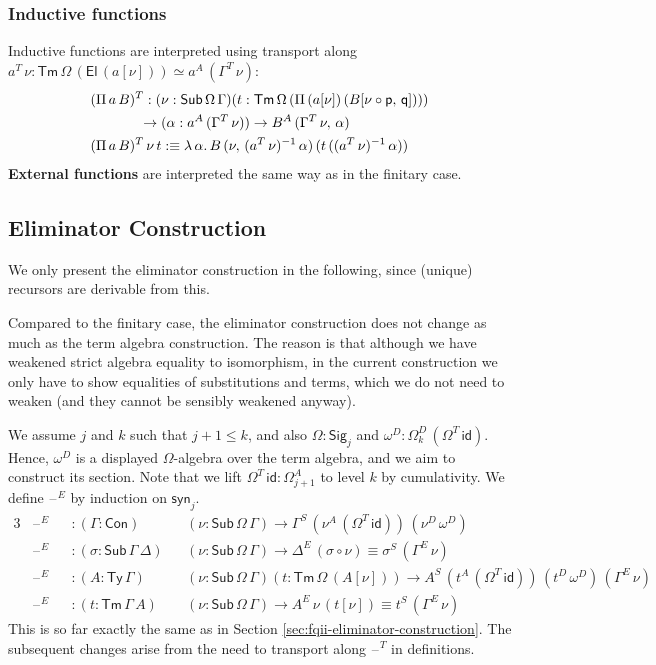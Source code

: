 \documentclass[12pt,a4paper,twoside,openany]{book}
\theoremstyle{remark}
\theoremstyle{definition}
\theoremstyle{theorem}
\newcommand{\id}{\mathsf{id}}
\newcommand{\Con}{\mathsf{Con}}
\newcommand{\Sub}{\mathsf{Sub}}
\newcommand{\Tm}{\mathsf{Tm}}
\newcommand{\Ty}{\mathsf{Ty}}
\newcommand{\El}{\mathsf{El}}
\newcommand{\blank}{\mathord{\hspace{1pt}\text{--}\hspace{1pt}}}
\newcommand{\Pii}{\Pi}
\newcommand{\Sig}{\mathsf{Sig}}
\newcommand{\p}{\mathsf{p}}
\newcommand{\q}{\mathsf{q}}
\newcommand{\syn}{\mathsf{syn}}
\newcommand{\defn}{:\equiv}
\begin{document}
\subsubsection{Inductive functions}
Inductive functions are interpreted using transport along $a^T\,\nu :
\Tm\,\Omega\,(\El\,(a[\nu])) \simeq a^A\,(\Gamma^T\,\nu)$:
\begin{alignat*}{3}
  &(\Pii\,a\,B)^T : (\nu : \Sub\,\Omega\,\Gamma)(t : \Tm\,\Omega\,(\Pii\,(a[\nu])\,(B[\nu\circ\p,\,\q])))\\
  & \hspace{3.5em}\to (\alpha : a^A\,(\Gamma^T\,\nu)) \to B^A\,(\Gamma^T\,\nu,\,\alpha)\\
  &(\Pii\,a\,B)^T\,\nu\,t \defn \lambda\,\alpha.\,
         B\,(\nu,\,(a^T\,\nu)^{-1}\,\alpha)\,(t\,((a^T\,\nu)^{-1}\,\alpha))
\end{alignat*}
\textbf{External functions} are interpreted the same way as in the finitary case.

\subsection{Eliminator Construction}

We only present the eliminator construction in the following, since (unique)
recursors are derivable from this.

Compared to the finitary case, the eliminator construction does not change as
much as the term algebra construction. The reason is that although we have
weakened strict algebra equality to isomorphism, in the current construction we
only have to show equalities of substitutions and terms, which we do not need to
weaken (and they cannot be sensibly weakened anyway).

We assume $j$ and $k$ such that $ j + 1 \leq k$, and also $\Omega : \Sig_j$ and
$\omega^D : \Omega^D_k\,(\Omega^T\,\id)$. Hence, $\omega^D$ is a displayed
$\Omega$-algebra over the term algebra, and we aim to construct its section.
Note that we lift $\Omega^T\,\id : \Omega^A_{j+1}$ to level $k$ by cumulativity.
We define $\blank^E$ by induction on $\syn_j$.
\begin{alignat*}{3}
  &\blank^E &&: (\Gamma : \Con)&&(\nu : \Sub\,\Omega\,\Gamma) \to \Gamma^S\,(\nu^A\,(\Omega^T\,\id))\,(\nu^D\,\omega^D)\\
  &\blank^E &&: (\sigma : \Sub\,\Gamma\,\Delta)&&(\nu : \Sub\,\Omega\,\Gamma) \to \Delta^E\,(\sigma \circ \nu) \equiv \sigma^S\,(\Gamma^E\,\nu)\\
  &\blank^E &&: (A : \Ty\,\Gamma)&&(\nu : \Sub\,\Omega\,\Gamma)(t : \Tm\,\Omega\,(A[\nu]))
     \to A^S\,(t^A\,(\Omega^T\,\id))\,(t^D\,\omega^D)\,(\Gamma^E\,\nu)\\
  &\blank^E &&: (t : \Tm\,\Gamma\,A)&&(\nu : \Sub\,\Omega\,\Gamma) \to A^E\,\nu\,(t[\nu]) \equiv t^S\,(\Gamma^E\,\nu)
\end{alignat*}
This is so far exactly the same as in Section
\ref{sec:fqii-eliminator-construction}. The subsequent changes arise from
the need to transport along $\blank^T$ in definitions.
\end{document}

